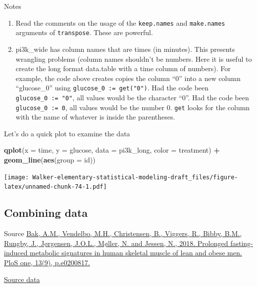 \documentclass[]{book}
\newenvironment{Shaded}{\begin{snugshade}}{\end{snugshade}}
\newcommand{\DataTypeTok}[1]{\textcolor[rgb]{0.13,0.29,0.53}{#1}}
\newcommand{\KeywordTok}[1]{\textcolor[rgb]{0.13,0.29,0.53}{\textbf{#1}}}
\newcommand{\NormalTok}[1]{#1}
\newcommand{\OperatorTok}[1]{\textcolor[rgb]{0.81,0.36,0.00}{\textbf{#1}}}
\newcommand{\StringTok}[1]{\textcolor[rgb]{0.31,0.60,0.02}{#1}}
\providecommand{\tightlist}{%
  \setlength{\itemsep}{0pt}\setlength{\parskip}{0pt}}
\begin{document}
Notes

\begin{enumerate}
\def\labelenumi{\arabic{enumi}.}
\tightlist
\item
  Read the comments on the usage of the \texttt{keep.names} and \texttt{make.names} arguments of \texttt{transpose}. These are powerful.
\item
  pi3k\_wide has column names that are times (in minutes). This presents wrangling problems (column names shouldn't be numbers. Here it is useful to create the long format data.table with a time column of numbers). For example, the code above creates copies the column ``0'' into a new column ``glucose\_0'' using \texttt{glucose\_0\ :=\ get("0")}. Had the code been \texttt{glucose\_0\ :=\ "0"}, all values would be the character ``0''. Had the code been \texttt{glucose\_0\ :=\ 0}, all values would be the number 0. \texttt{get} looks for the column with the name of whatever is inside the parentheses.
\end{enumerate}

Let's do a quick plot to examine the data

\begin{Shaded}
\begin{Highlighting}[]
\KeywordTok{qplot}\NormalTok{(}\DataTypeTok{x =}\NormalTok{ time,}
      \DataTypeTok{y =}\NormalTok{ glucose,}
      \DataTypeTok{data =}\NormalTok{ pi3k_long,}
      \DataTypeTok{color =}\NormalTok{ treatment) }\OperatorTok{+}
\StringTok{  }\KeywordTok{geom_line}\NormalTok{(}\KeywordTok{aes}\NormalTok{(}\DataTypeTok{group =}\NormalTok{ id))}
\end{Highlighting}
\end{Shaded}

\texttt{[image: Walker-elementary-statistical-modeling-draft\_files/figure-latex/unnamed-chunk-74-1.pdf]}

\hypertarget{combining-data}{%
\subsection{Combining data}\label{combining-data}}

Source \href{https://journals.plos.org/plosone/article?id=10.1371/journal.pone.0200817}{Bak, A.M., Vendelbo, M.H., Christensen, B., Viggers, R., Bibby, B.M., Rungby, J., Jørgensen, J.O.L., Møller, N. and Jessen, N., 2018. Prolonged fasting-induced metabolic signatures in human skeletal muscle of lean and obese men. PloS one, 13(9), p.e0200817.}

\href{https://datadryad.org/stash/dataset/doi:10.5061/dryad.6121hj7}{Source data}
\end{document}
